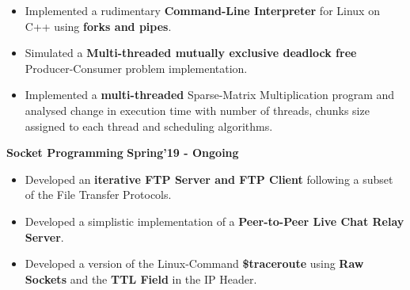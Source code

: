 \documentclass[10pt]{article}
\begin{document}
\begin{itemize}
    \item Implemented a rudimentary \textbf{Command-Line Interpreter} for Linux on C++ using \textbf{forks and pipes}. \\[-1.9em]
    \item Simulated a \textbf{Multi-threaded mutually exclusive deadlock free} Producer-Consumer problem implementation.\\[-1.9em]
    \item Implemented a \textbf{multi-threaded} Sparse-Matrix Multiplication program and analysed change in execution time with number of threads, chunks size assigned to each thread and scheduling algorithms.\\[-1em]
\end{itemize}
\vspace{-0.5ex}    
\large {\textbf{Socket Programming}} \normalsize \href{https://github.com/shmundhra/Socket-Programming}{\faGithub} {\hfill}\textbf{Spring'19 - Ongoing}\\[-1.7em]
\begin{itemize}
    \item Developed an \textbf{iterative FTP Server and FTP Client} following a subset of the File Transfer Protocols.\\[-1.9em] 
    \item Developed a simplistic implementation of a \textbf{Peer-to-Peer Live Chat Relay Server}.\\[-1.9em]
    \item Developed a version of the Linux-Command \textbf{\$traceroute} using \textbf{Raw Sockets} and the \textbf{TTL Field} in the IP Header.
\end{itemize}
\end{document}
